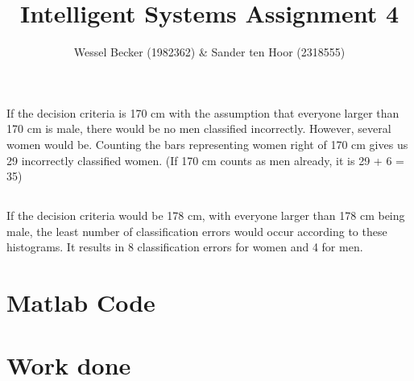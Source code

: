 \documentclass[10pt,a4paper]{article}
\begin{document}
\title{Intelligent Systems Assignment 4}
\author{Wessel Becker (1982362) \& Sander ten Hoor (2318555)}
\maketitle

\newcommand{\simpefigure}[3]{
	\begin{figure}[H]

	\end{figure}
}

\section{}
\subsection{}

\subsection{}
If the decision criteria is 170 cm with the assumption that everyone larger than 170 cm is male, there would be no men classified incorrectly. However, several women would be. Counting the bars representing women right of 170 cm gives us 29 incorrectly classified women.
(If 170 cm counts as men already, it is 29 + 6 = 35)

\subsection{}
If the decision criteria would be 178 cm, with everyone larger than 178 cm being male, the least number of classification errors would occur according to these histograms. It results in 8 classification errors for women and 4 for men.

\section{}
\subsection{}

\subsection{}

\section{Matlab Code}

\section{Work done}
\end{document}
